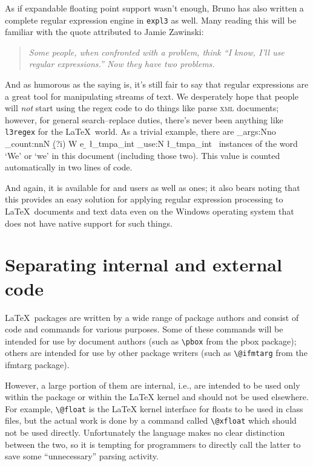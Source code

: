 \documentclass{ltnews}
\begin{document}
As if expandable floating point support wasn't enough, Bruno has also written a complete regular expression engine in \texttt{expl3} as well.
Many reading this will be familiar with the quote attributed to Jamie Zawinski:
\begin{quote}\itshape
Some people, when confronted with a problem, think
``I know, I'll use regular expressions.''
Now they have two problems.
\end{quote}
And as humorous as the saying is, it's still fair to say that regular expressions are a great tool for manipulating streams of text.
We desperately hope that people will \emph{not} start using the regex code to do things like parse \textsc{xml} documents; however, for general search--replace duties, there's never been anything like \texttt{l3regex} for the \LaTeX\ world.
As a trivial example, there are
\CatchFileDef{}%
\ExplSyntaxOn
\exp_args:Nno \regex_count:nnN { \b (?i) W e \b  } {\thisfile} \l_tmpa_int
\int_use:N \l_tmpa_int
\ExplSyntaxOff
~instances of the word `We' or `we' in this document (including those two).
This value is counted automatically in two lines of code.

And again, it is available for  and  users as well as  ones; it also bears noting that this provides an easy solution for applying regular expression processing to \LaTeX\ documents and text data even on the Windows operating system that does not have native support for such things.


\section{Separating internal and external code}

\LaTeX\ packages are written by a wide range of package authors and consist of code and commands for various purposes.
Some of these commands will be intended for use by document authors (such as \verb|\pbox| from the \textsf{pbox} package); others are intended for use by other package writers (such as \verb|\@ifmtarg| from the \textsf{ifmtarg} package).

However, a large portion of them are internal, i.e., are intended to
be used only within the package or within the \LaTeX{} kernel and
should not be used elsewhere. For example, \verb|\@float| is the
\LaTeX{} kernel interface for floats to be used in class files, but
the actual work is done by a command called \verb|\@xfloat| which
should not be used directly. Unfortunately the \LaTeXe{} language
makes no clear distinction between the two, so it is tempting for
programmers to directly call the latter to save some ``unnecessary''
parsing activity.
\end{document}
